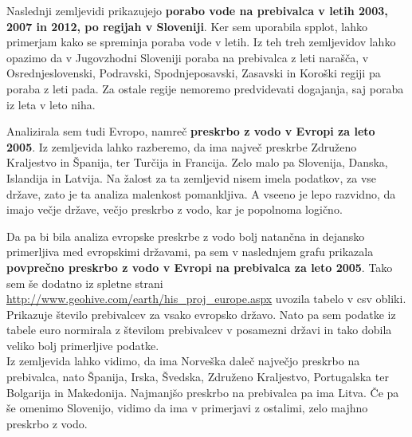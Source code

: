 \documentclass[11pt,a4paper]{article}
\begin{document}

\newpage
Naslednji zemljevidi prikazujejo \textbf{porabo vode na prebivalca v letih 2003, 2007 in 2012, po regijah v Sloveniji}. Ker sem uporabila spplot, lahko primerjam kako se spreminja poraba vode v letih. Iz teh treh zemljevidov lahko opazimo da v Jugovzhodni Sloveniji poraba na prebivalca z leti narašča, v Osrednjeslovenski, Podravski, Spodnjeposavski, Zasavski in Koroški regiji pa poraba z leti pada. Za ostale regije nemoremo predvidevati dogajanja, saj poraba iz leta v leto niha. 



\newpage

Analizirala sem tudi Evropo, namreč \textbf{preskrbo z vodo v Evropi za leto 2005}. Iz zemljevida lahko razberemo, da ima največ preskrbe Združeno Kraljestvo in Španija, ter Turčija in Francija. Zelo malo pa Slovenija, Danska, Islandija in Latvija. Na žalost za ta zemljevid nisem imela podatkov, za vse države, zato je ta analiza malenkost pomankljiva. A vseeno je lepo razvidno, da imajo večje države, večjo preskrbo z vodo, kar je popolnoma logično.



\newpage

Da pa bi bila analiza evropske preskrbe z vodo bolj natančna in dejansko primerljiva med evropskimi državami, pa sem v naslednjem grafu prikazala \textbf{povprečno preskrbo z vodo v Evropi na prebivalca za leto 2005}. Tako sem še dodatno iz spletne strani \url{http://www.geohive.com/earth/his_proj_europe.aspx} uvozila tabelo v csv obliki. Prikazuje število prebivalcev za vsako evropsko državo. Nato pa sem podatke iz tabele euro normirala z številom prebivalcev v posamezni državi in tako dobila veliko bolj primerljive podatke.\\

Iz zemljevida lahko vidimo, da ima Norveška daleč največjo preskrbo na prebivalca, nato Španija, Irska, Švedska, Združeno Kraljestvo, Portugalska ter Bolgarija in Makedonija. Najmanjšo preskrbo na prebivalca pa ima Litva.
Če pa še omenimo Slovenijo, vidimo da ima v primerjavi z ostalimi, zelo majhno preskrbo z vodo.



% 
\end{document}
